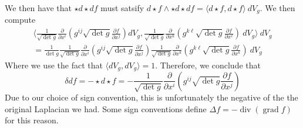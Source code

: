 \documentclass[psamsfonts]{amsart}
\theoremstyle{definition}
\theoremstyle{remark}
\DeclareMathOperator{\dv}{div}
\DeclareMathOperator{\grad}{grad}
\begin{document}
We then have that $\star d\star df$ must satsify $d\star f \wedge \star d\star df = \langle d\star f, d\star f \rangle~dV_g$. We then compute
\begin{align*}
\biggl\langle \frac{1}{\sqrt{\det g}} \frac{\partial}{\partial x^i}\left( g^{ij}\sqrt{\det g}\frac{\partial f}{\partial x^j} \right) dV_g, \frac{1}{\sqrt{\det g}} \frac{\partial}{\partial x^k}\left( g^{k\ell}\sqrt{\det g}\frac{\partial f}{\partial x^\ell} \right)~dV_g\biggr\rangle~dV_g  \\
= \frac{1}{\det g}\frac{1}{\sqrt{\det g}} \frac{\partial}{\partial x^i}\left( g^{ij}\sqrt{\det g}\frac{\partial f}{\partial x^j} \right)    \frac{1}{\sqrt{\det g}} \frac{\partial}{\partial x^k}\left( g^{k\ell}\sqrt{\det g}\frac{\partial f}{\partial x^k} \right) ~dV_g
\end{align*}
Where we use the fact that $\langle dV_g, dV_g \rangle = 1$. Therefore, we conclude that 
$$\delta df = -\star d\star f = -\frac{1}{\sqrt{\det g}} \frac{\partial}{\partial x^i}\left( g^{ij}\sqrt{\det g}\frac{\partial f}{\partial x^j} \right) $$
Due to our choice of sign convention, this is unfortunately the negative of the the original Laplacian we had. Some sign conventions define $\Delta f = -\dv(\grad f)$ for this reason.

%
\end{document}
